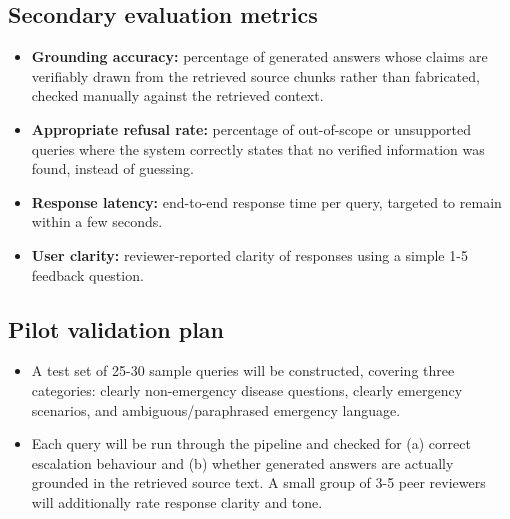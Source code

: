 \documentclass[11pt,a4paper]{article}
\begin{document}
\subsection{Secondary evaluation metrics}
\begin{itemize}
    \item \textbf{Grounding accuracy:} percentage of generated answers whose claims are verifiably drawn from the retrieved source chunks rather than fabricated, checked manually against the retrieved context.
    \item \textbf{Appropriate refusal rate:} percentage of out-of-scope or unsupported queries where the system correctly states that no verified information was found, instead of guessing.
    \item \textbf{Response latency:} end-to-end response time per query, targeted to remain within a few seconds.
    \item \textbf{User clarity:} reviewer-reported clarity of responses using a simple 1-5 feedback question.
\end{itemize}

\subsection{Pilot validation plan}
\begin{itemize}
    \item A test set of 25-30 sample queries will be constructed, covering three categories: clearly non-emergency disease questions, clearly emergency scenarios, and ambiguous/paraphrased emergency language.
    \item Each query will be run through the pipeline and checked for (a) correct escalation behaviour and (b) whether generated answers are actually grounded in the retrieved source text. A small group of 3-5 peer reviewers will additionally rate response clarity and tone.
\end{itemize}
\end{document}
